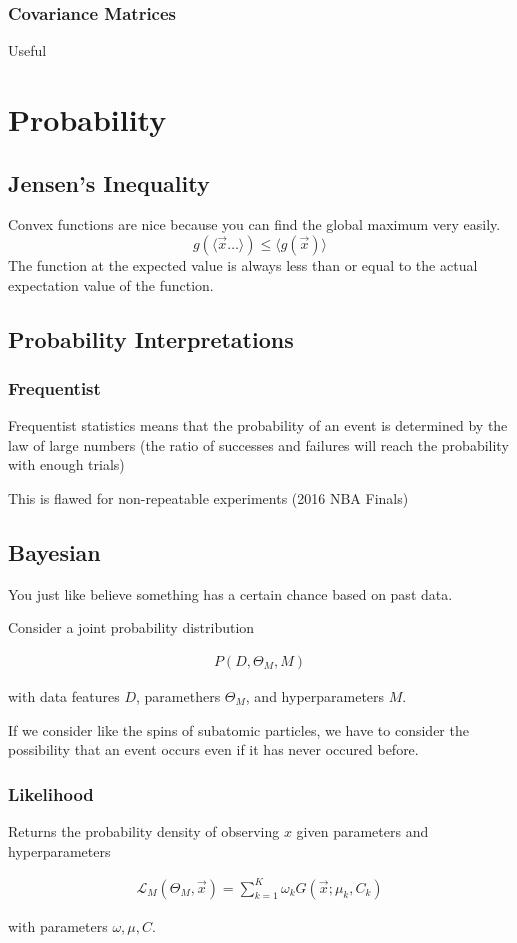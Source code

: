 \documentclass[fleqn]{report}
\newcommand{\equations} [1] {
\begin{gather*}
#1
\end{gather*}
}
\begin{document}
\subsection{Covariance Matrices}
Useful 

\chapter{Probability}

\section{Jensen's Inequality}
Convex functions are nice because you can find the global maximum very easily. 
\[
g(\langle \vec x \ldots \rangle )
\leq 
\langle g(\vec x) \rangle 
\]
The function at the expected value is always less than or equal 
to the actual expectation value of the function. 

\section{Probability Interpretations}
\subsection{Frequentist}
Frequentist statistics means that the probability of an event 
is determined by the law of large numbers (the ratio of successes 
 and failures will reach the probability with enough trials)

This is flawed for non-repeatable experiments (2016 NBA Finals)

\section{Bayesian}
You just like believe something has a certain chance based on past data. 

Consider a joint probability distribution 
\equations{
    P(D, \Theta_M, M)
}
with data features $D$, paramethers $\Theta_M$, and 
hyperparameters $M$.

If we consider like the spins of subatomic particles, we 
have to consider the possibility that an event occurs even if 
it has never occured before. 

\subsection{Likelihood}
Returns the probability density of observing $x$ given 
parameters and hyperparameters 
\equations{
    \mathcal L_M(\Theta_M, \vec x)
    =
    \sum^K_{k = 1}
    \omega_k G(\vec x; \mu_k, C_k)
}
with parameters $\omega, \mu, C$.
\end{document}
